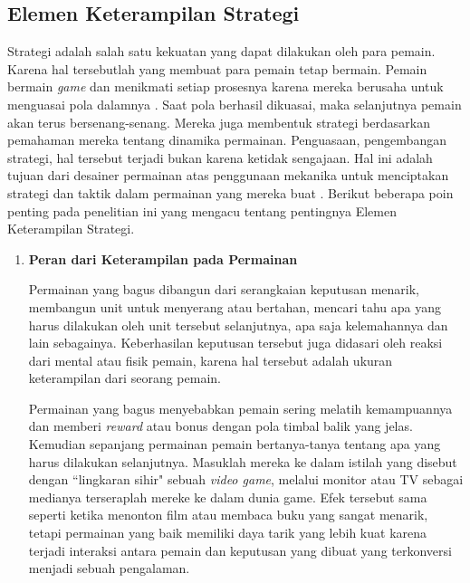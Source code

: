 \begin{subs}
\begin{enumerate}[label=\textbf{\alph*).}]
	\end{enumerate}
	
	\subsection{Elemen Keterampilan Strategi}
	\label{sec:sub_sec2_strategi}
	\vspace{1ex}
	
	Strategi adalah salah satu kekuatan yang dapat dilakukan oleh para pemain. Karena hal tersebutlah yang membuat para pemain tetap bermain. Pemain bermain \textit{game} dan menikmati setiap prosesnya karena mereka berusaha untuk menguasai pola dalamnya \citep{Koster2013}. Saat pola berhasil dikuasai, maka selanjutnya pemain akan terus bersenang-senang. Mereka juga membentuk strategi berdasarkan pemahaman mereka tentang dinamika permainan. Penguasaan, pengembangan strategi, hal tersebut terjadi bukan karena ketidak sengajaan. Hal ini adalah tujuan dari desainer permainan atas penggunaan mekanika untuk menciptakan strategi dan taktik dalam permainan yang mereka buat \cite{Brathwaite2009}. Berikut beberapa poin penting pada penelitian ini yang mengacu tentang pentingnya Elemen Keterampilan Strategi.
	\vspace{1ex}

	\begin{enumerate}[label=\textbf{\alph*).}]
		
		\item \textbf{Peran dari Keterampilan pada Permainan}
		\setlength{\parindent}{0.8cm}
	
		Permainan yang bagus dibangun dari serangkaian keputusan menarik, membangun unit untuk menyerang atau bertahan, mencari tahu apa yang harus dilakukan oleh unit tersebut selanjutnya, apa saja kelemahannya dan lain sebagainya. Keberhasilan keputusan tersebut juga didasari oleh reaksi dari mental atau fisik pemain, karena hal tersebut adalah ukuran keterampilan dari seorang pemain.
		\vspace{1ex}
	
		Permainan yang bagus menyebabkan pemain sering melatih kemampuannya dan memberi \textit{reward} atau bonus dengan pola timbal balik yang jelas. Kemudian sepanjang permainan pemain bertanya-tanya tentang apa yang harus dilakukan selanjutnya. Masuklah mereka ke dalam istilah yang disebut dengan ``lingkaran sihir" sebuah \textit{video game}, melalui monitor atau TV sebagai medianya terseraplah mereke ke dalam dunia game. Efek tersebut sama seperti ketika menonton film atau membaca buku yang sangat menarik, tetapi permainan yang baik memiliki daya tarik yang lebih kuat karena terjadi interaksi antara pemain dan keputusan yang dibuat yang terkonversi menjadi sebuah pengalaman.
		\vspace{1ex}
		

\end{enumerate}
\end{subs}

